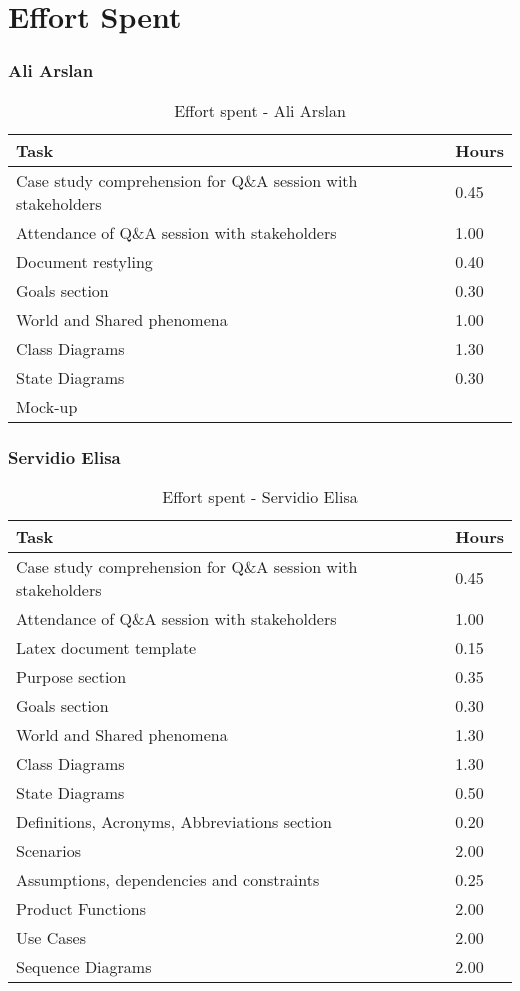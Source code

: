 \chapter{Effort Spent}

\subsection{Ali Arslan}
\renewcommand{\arraystretch}{2}
\begin{longtable}{|m{9cm}|m{1.2cm}|}
\caption{Effort spent - Ali Arslan}\\
\hline
\endfirsthead
\endhead
\hline
\endlastfoot
\rowcolor{green2}
\textbf{Task} & \hfil {\textbf{Hours}}\\
\hline
Case study comprehension for Q\&A session with stakeholders & \hfil 0.45\\
Attendance of Q\&A session with stakeholders & \hfil 1.00\\
Document restyling	& \hfil 0.40\\
Goals section & \hfil 0.30\\
World and Shared phenomena & \hfil 1.00\\
Class Diagrams & \hfil 1.30\\
State Diagrams & \hfil 0.30\\
Mock-up  & \hfil \\
\hline
\end{longtable}

\subsection{Servidio Elisa}
\renewcommand{\arraystretch}{2}
\begin{longtable}{|m{9cm}|m{1.2cm}|}
\caption{Effort spent - Servidio Elisa}\\
\hline
\endfirsthead
\endhead
\hline
\endlastfoot
\rowcolor{green2}
\textbf{Task} &\hfil {\textbf{Hours}}\\
\hline
Case study comprehension for Q\&A session with stakeholders & \hfil 0.45\\
Attendance of Q\&A session with stakeholders & \hfil 1.00\\
Latex document template & \hfil 0.15\\
Purpose section	& \hfil 0.35\\
Goals section & \hfil 0.30\\
World and Shared phenomena & \hfil 1.30\\
Class Diagrams & \hfil 1.30\\
State Diagrams & \hfil 0.50\\
Definitions, Acronyms, Abbreviations section & \hfil 0.20\\
Scenarios & \hfil 2.00\\
Assumptions, dependencies and constraints & \hfil 0.25\\
Product Functions & \hfil 2.00\\
Use Cases & \hfil 2.00\\
Sequence Diagrams & \hfil 2.00\\
\hline
\end{longtable}

